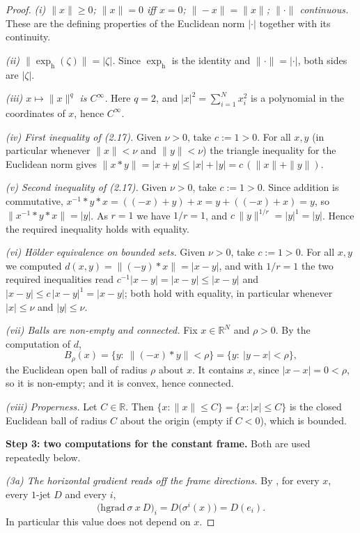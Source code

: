 \begin{proof}
\emph{(i) $\|x\|\ge0$; $\|x\|=0$ iff $x=0$; $\|-x\|=\|x\|$; $\|\cdot\|$ continuous.} These
are the defining properties of the Euclidean norm $|\cdot|$ together with its continuity.

\emph{(ii) $\|\exp_{\mathrm h}(\zeta)\|=|\zeta|$.} Since $\exp_{\mathrm h}$ is the identity
and $\|\cdot\|=|\cdot|$, both sides are $|\zeta|$.

\emph{(iii) $x\mapsto\|x\|^{q}$ is $C^\infty$.} Here $q=2$, and
$|x|^{2}=\sum_{i=1}^{N}x_i^{2}$ is a polynomial in the coordinates of $x$, hence $C^\infty$.

\emph{(iv) First inequality of (2.17).} Given $\nu>0$, take $c:=1>0$. For all $x,y$
(in particular whenever $\|x\|<\nu$ and $\|y\|<\nu$) the triangle inequality for the
Euclidean norm gives $\|x*y\|=|x+y|\le|x|+|y|=c\,(\|x\|+\|y\|)$.

\emph{(v) Second inequality of (2.17).} Given $\nu>0$, take $c:=1>0$. Since addition
is commutative, $x^{-1}*y*x=((-x)+y)+x=y+((-x)+x)=y$, so
$\|x^{-1}*y*x\|=|y|$. As $r=1$ we have $1/r=1$, and $c\,\|y\|^{1/r}=|y|^{1}=|y|$. Hence the
required inequality holds with equality.

\emph{(vi) H\"older equivalence on bounded sets.} Given $\nu>0$, take $c:=1>0$. For all
$x,y$ we computed $d(x,y)=\|(-y)*x\|=|x-y|$, and with $1/r=1$ the two required inequalities
read $c^{-1}|x-y|=|x-y|\le|x-y|$ and $|x-y|\le c\,|x-y|^{1}=|x-y|$; both hold with
equality, in particular whenever $|x|\le\nu$ and $|y|\le\nu$.

\emph{(vii) Balls are non-empty and connected.} Fix $x\in\mathbb R^N$ and $\rho>0$. By the
computation of $d$,
\[
 B_\rho(x)=\{y:\ \|(-x)*y\|<\rho\}=\{y:\ |y-x|<\rho\},
\]
the Euclidean open ball of radius $\rho$ about $x$. It contains $x$, since $|x-x|=0<\rho$,
so it is non-empty; and it is convex, hence connected.

\emph{(viii) Properness.} Let $C\in\mathbb R$. Then
$\{x:\|x\|\le C\}=\{x:|x|\le C\}$ is the closed Euclidean ball of radius $C$ about the
origin (empty if $C<0$), which is bounded.

\medskip\noindent\textbf{Step 3: two computations for the constant frame.} Both are used
repeatedly below.

\emph{(3a) The horizontal gradient reads off the frame directions.} By ,
for every $x$, every $1$-jet $D$ and every $i$,
\[
 \big(\mathrm{hgrad}\ \sigma\ x\ D\big)_i=D\big(\sigma^i(x)\big)=D(e_i).
\]
In particular this value does not depend on $x$.


\end{proof}
